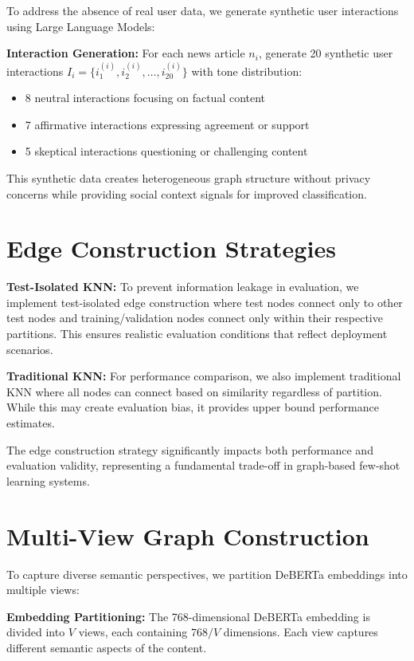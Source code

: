 To address the absence of real user data, we generate synthetic user interactions using Large Language Models:

\textbf{Interaction Generation:} For each news article $n_i$, generate 20 synthetic user interactions $I_i = \{i_1^{(i)}, i_2^{(i)}, \ldots, i_{20}^{(i)}\}$ with tone distribution:
\begin{itemize}
\item 8 neutral interactions focusing on factual content
\item 7 affirmative interactions expressing agreement or support  
\item 5 skeptical interactions questioning or challenging content
\end{itemize}

This synthetic data creates heterogeneous graph structure without privacy concerns while providing social context signals for improved classification.

\section{Edge Construction Strategies}

\textbf{Test-Isolated KNN:} To prevent information leakage in evaluation, we implement test-isolated edge construction where test nodes connect only to other test nodes and training/validation nodes connect only within their respective partitions. This ensures realistic evaluation conditions that reflect deployment scenarios.

\textbf{Traditional KNN:} For performance comparison, we also implement traditional KNN where all nodes can connect based on similarity regardless of partition. While this may create evaluation bias, it provides upper bound performance estimates.

The edge construction strategy significantly impacts both performance and evaluation validity, representing a fundamental trade-off in graph-based few-shot learning systems.

\section{Multi-View Graph Construction}

To capture diverse semantic perspectives, we partition DeBERTa embeddings into multiple views:

\textbf{Embedding Partitioning:} The 768-dimensional DeBERTa embedding is divided into $V$ views, each containing $768/V$ dimensions. Each view captures different semantic aspects of the content.


